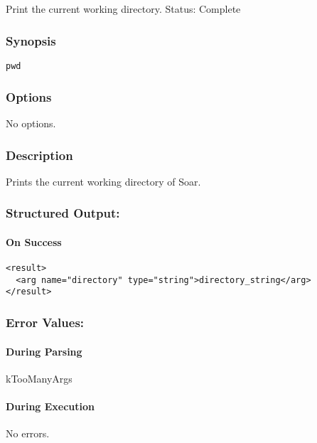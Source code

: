 \subsection{}
\label{pwd}
Print the current working directory. 
 Status: Complete
\subsubsection*{Synopsis}
\begin{verbatim}
pwd
\end{verbatim}
\subsubsection*{Options}
 No options. 
\subsubsection*{Description}
 Prints the current working directory of Soar. 
\subsubsection*{Structured Output:}
\paragraph*{On Success}
\begin{verbatim}
<result>
  <arg name="directory" type="string">directory_string</arg>
</result>
\end{verbatim}
\subsubsection*{Error Values:}
\paragraph*{During Parsing}
 kTooManyArgs
\paragraph*{During Execution}
 No errors. 
